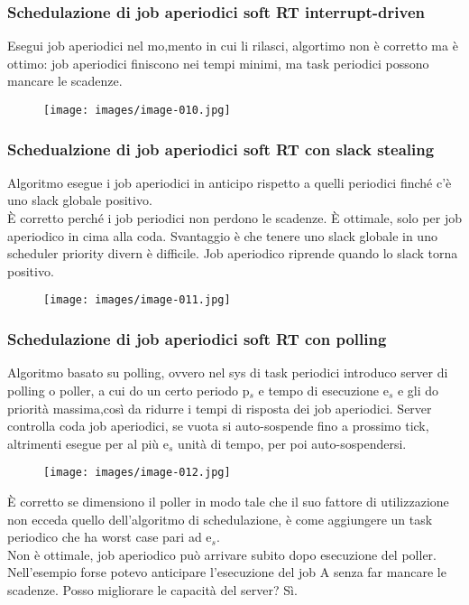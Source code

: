 \documentclass[12pt, oneside]{extbook}
\begin{document}
\subsubsection{Schedulazione di job aperiodici soft RT interrupt-driven}
Esegui job aperiodici nel mo,mento in cui li rilasci, algortimo non è corretto ma è ottimo: job aperiodici finiscono nei tempi minimi, ma task periodici possono mancare le scadenze.\\
\begin{figure}[!h]
\centering
\texttt{[image: images/image-010.jpg]}
\end{figure}
\subsubsection{Schedualzione di job aperiodici soft RT con slack stealing}
Algoritmo esegue i job aperiodici in anticipo rispetto a quelli periodici finché c'è uno slack globale positivo.\\ È corretto perché i job periodici non perdono le scadenze. È ottimale, solo per job aperiodico in cima alla coda. Svantaggio è che tenere uno slack globale in uno scheduler priority divern è difficile.
Job aperiodico riprende quando lo slack torna positivo.\\
\begin{figure}[!h]
\centering
\texttt{[image: images/image-011.jpg]}
\end{figure}
\subsubsection{Schedulazione di job aperiodici soft RT con polling}
Algoritmo basato su polling, ovvero nel sys di task periodici introduco server di polling o poller, a cui do un certo periodo p$_{s}$ e tempo di esecuzione e$_{s}$ e gli do priorità massima,così da ridurre i tempi di risposta dei job aperiodici. Server controlla coda job aperiodici, se vuota si auto-sospende fino a prossimo tick, altrimenti esegue per al più
e$_{s}$ unità di tempo, per poi auto-sospendersi.\\ 
\begin{figure}[!h]
\centering
\texttt{[image: images/image-012.jpg]}
\end{figure}
È corretto se dimensiono il poller in modo tale che il suo fattore di utilizzazione non ecceda quello dell'algoritmo di schedulazione, è come aggiungere un task periodico che ha worst case pari ad e$_{s}$. \\ Non è ottimale, job aperiodico può arrivare subito dopo esecuzione del poller. Nell'esempio forse potevo anticipare l'esecuzione del job A senza far mancare le scadenze. Posso migliorare le capacità del server? Sì.
\end{document}
